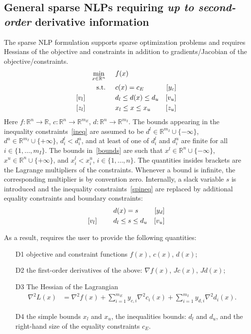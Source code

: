 \subsection{General sparse NLPs requiring \textit{up to second-order} derivative information}
The sparse NLP formulation supports sparse optimization problems and requires Hessians of the objective and constraints in addition to gradients/Jacobian of the objective/constraints.
\begin{align}
&&&&\min_{x\in\mathbb{R}^n} & \hspace{0.5cm} f(x) &&&& \label{spobj}\\
&&&&\textnormal{s.t.} &\hspace{0.5cm}  c(x)=c_E &[y_c]&&&\\
&&[v_l]&&& \hspace{0.5cm} d_l \leq d(x) \leq d_u  &[v_u]&&&\label{spineq} \\
&&[z_l]&&& \hspace{0.5cm} x_l \leq x \leq x_u & [z_u] &&&\label{spbounds}
\end{align}
Here $f:\mathbb{R}^n\rightarrow\mathbb{R}$, $c:\mathbb{R}^n\rightarrow\mathbb{R}^{m_E}$, $d:\mathbb{R}^n\rightarrow\mathbb{R}^{m_I}$. The bounds appearing in the inequality constraints~\eqref{ineq} are assumed to be $d^l\in\mathbb{R}^{m_I}\cup\{-\infty\}$, $d^u\in\mathbb{R}^{m_I}\cup\{+\infty\}$, $d_i^l < d_i^u$, and at least of one of $d_i^l$ and $d_i^u$ are finite for all $i\in\{1,\ldots,m_I\}$. The bounds in~\eqref{bounds} are such that $x^l\in\mathbb{R}^{n}\cup\{-\infty\}$, $x^u\in\mathbb{R}^{n}\cup\{+\infty\}$, and $x_i^l < x_i^u$, $i\in\{1,\ldots,n\}$. The quantities insides brackets are the Lagrange multipliers of the constraints. Whenever a bound is infinite, the corresponding multiplier is by convention zero.
Internally, a slack variable $s$ is introduced and the inequality constraints~\eqref{spineq} are replaced by additional equality constraints and boundary constraints:
\begin{align}
&&&&& \hspace{0.5cm} d(x) = s &[y_d]&&& \\
&&[v_l]&&& \hspace{0.5cm} d_l \leq s \leq d_u  &[v_u]&&&\label{spineq_s} 
\end{align}

As a result, \Hi requires the user to provide the following quantities:
\begin{itemize}
\item[D1] objective and constraint functions $f(x)$, $c(x)$, $d(x)$;
\item[D2] the first-order derivatives of the above: $\nabla f(x)$, $Jc(x)$, $Jd(x)$;
\item[D3] The Hessian of the Lagrangian
  \begin{align}
\nabla^2 L(x)& = \nabla^2 f(x) + \sum_{i=1}^{m_E} y_{c,i} \nabla^2 c_i(x) + \sum_{i=1}^{m_I} y_{d,i} \nabla^2 d_i(x).\label{spHess}
\end{align}
\item[D4] the simple bounds $x_l$ and $x_u$, the inequalities bounds: $d_l$ and $d_u$, and the right-hand size of the equality constraints $c_E$.
\end{itemize}

